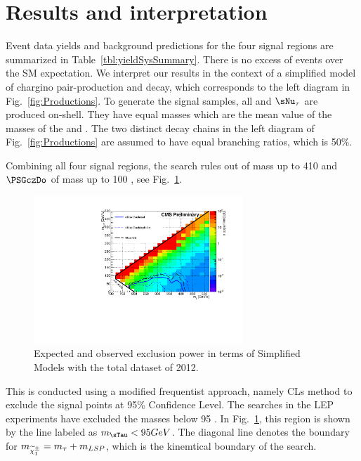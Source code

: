 \section{Results and interpretation}
\label{sect:stat}



Event data yields and background predictions for the four signal regions are summarized in Table~\ref{tbl:yieldSysSummary}.
There is no excess of events over the SM expectation.  We interpret our results in the context
of a simplified model of chargino pair-production and decay, which corresponds to the left
diagram in Fig.~\ref{fig:Productions}. To generate the signal samples, all  \sTau and $\sNu_{\tau}$ 
are produced  on-shell. They have equal masses which are the mean value of the masses of the \chione   and \PSGczDo.
The two distinct decay chains in the left diagram of Fig.~\ref{fig:Productions} are assumed to have equal branching ratios, which is 50\%.

Combining all four signal regions,
the search rules out \chione of mass up to 410 \GeV and  $\PSGczDo$ of mass up to 100 \GeV,
see Fig.~\ref{fig:limit_final}.
\begin{linenomath}
\begin{figure}[h]
\centering
\includegraphics[width=0.7\textwidth,keepaspectratio=true]{StatisticsFig/Exclusion4Bins.pdf}
\caption{Expected and observed exclusion power in terms of Simplified Models
with the total dataset of 2012. 
}
\label{fig:limit_final}
\end{figure}
\end{linenomath}
This is conducted using a modified frequentist approach, namely CLs method \cite{read:CLs} to 
exclude the signal points at 95\% Confidence Level.
The \sTau searches in the LEP experiments \cite{lepsusy} have excluded the masses below 95 \GeV. In Fig.~\ref{fig:limit_final}, 
this region is shown by the line labeled as $m_{\sTau} < 95 GeV$. The diagonal line denotes the boundary for $m_{\widetilde{\chi}^{\pm}_1} = m_{\tau} + m_{LSP}$, which is 
the kinemtical boundary of the search.



